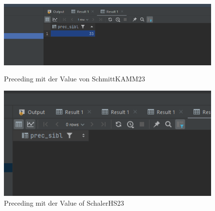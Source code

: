 \documentclass[11pt]{scrartcl}
\begin{document}
\begin{figure}[H]
    \begin{minipage}[b]{.4\linewidth}
        \begin{center}
            \includegraphics[width=\linewidth]{img_1.png}
            \caption{Preceding mit der Value von SchmittKAMM23}
        \end{center}
    \end{minipage}
    \hspace{.1\linewidth}
    \begin{minipage}[b]{.4\linewidth}
        \begin{center}
            \includegraphics[width=\linewidth]{img_4.png}
            \caption{Preceding mit der Value of SchalerHS23}
        \end{center}
    \end{minipage}
\end{figure}
\end{document}
